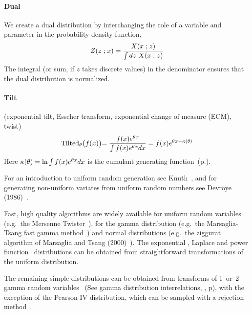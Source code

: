 \paragraph*{Dual}
We create a dual distribution by interchanging the role of a variable and parameter in the probability density function.
\[
Z(z\mathrel{;} x) = \frac{ X(x\mathrel{;} z)}{ \int dz\  X(x\mathrel{;} z)} 
\notag
\]
The integral (or sum, if $z$ takes discrete values) in the denominator ensures that the dual distribution is normalized.



\paragraph*{Tilt} (exponential tilt, Esscher transform, exponential change of measure (ECM), twist)~\cite{Esscher1932,Siegmund1976} 
\[
\operatorname{Tilted}_\theta\bigr( f(x) \bigl) =  \frac{ f(x) e^{\theta x} }{\int f(x) e^{\theta x} dx }
= f(x) e^{\theta x - \kappa(\theta) }  
\notag
\]
Here $\kappa(\theta)= \ln \int  f(x) e^{\theta x} dx$ is the cumulant generating function~(p.\pageref{CGF}).




\label{sec:random}
For an introduction to uniform random generation see Knuth~\cite{Knuth1997}, and for generating non-uniform variates from uniform random numbers see  Devroye (1986)~\cite{Devroye1986}. 

Fast, high quality algorithms are widely available for uniform random variables (e.g.\ the Mersenne Twister~\cite{Matsumoto1998}), for the gamma distribution (e.g.\ the Marsaglia-Tsang fast gamma method~\cite{Marsaglia2001}) and normal distributions (e.g.\ the ziggurat algorithm of Marsaglia and Tsang (2000)~\cite{Marsaglia2000}). The exponential , Laplace  and power function~ distributions can be obtained from straightforward transformations of the uniform distribution.

The remaining  simple distributions can be obtained from transforms of 1~or~2 gamma random variables~\cite{Devroye1986} (See gamma distribution interrelations, , p\pageref{gammatransforms}), with the exception of the Pearson IV distribution, which can be sampled with a rejection method~\cite{Devroye1986,Heinrich2004}.


